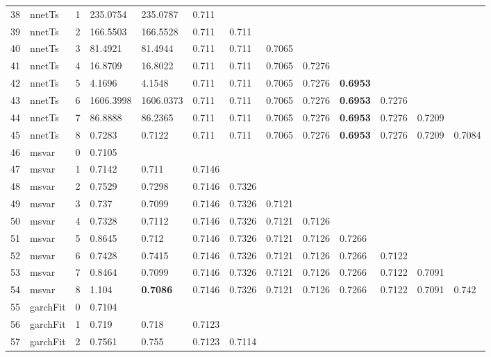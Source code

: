 \documentclass[10pt,a4paper]{article}
\begin{document}
\begin{table}[ht]
\begin{tabular}{rlrllllllllll}
  38 & nnetTs &     1 & 235.0754 & 235.0787 & 0.711 &  &  &  &  &  &  &  \\ 
  39 & nnetTs &     2 & 166.5503 & 166.5528 & 0.711 & 0.711 &  &  &  &  &  &  \\ 
  40 & nnetTs &     3 & 81.4921 & 81.4944 & 0.711 & 0.711 & 0.7065 &  &  &  &  &  \\ 
  41 & nnetTs &     4 & 16.8709 & 16.8022 & 0.711 & 0.711 & 0.7065 & 0.7276 &  &  &  &  \\ 
  42 & nnetTs &     5 & 4.1696 & 4.1548 & 0.711 & 0.711 & 0.7065 & 0.7276 & \textbf{0.6953} &  &  &  \\ 
  43 & nnetTs &     6 & 1606.3998 & 1606.0373 & 0.711 & 0.711 & 0.7065 & 0.7276 & \textbf{0.6953} & 0.7276 &  &  \\ 
  44 & nnetTs &     7 & 86.8888 & 86.2365 & 0.711 & 0.711 & 0.7065 & 0.7276 & \textbf{0.6953} & 0.7276 & 0.7209 &  \\ 
  45 & nnetTs &     8 & 0.7283 & 0.7122 & 0.711 & 0.711 & 0.7065 & 0.7276 & \textbf{0.6953} & 0.7276 & 0.7209 & 0.7084 \\ 
   \hline
46 & msvar &     0 & 0.7105 &  &  &  &  &  &  &  &  &  \\ 
  47 & msvar &     1 & 0.7142 & 0.711 & 0.7146 &  &  &  &  &  &  &  \\ 
  48 & msvar &     2 & 0.7529 & 0.7298 & 0.7146 & 0.7326 &  &  &  &  &  &  \\ 
  49 & msvar &     3 & 0.737 & 0.7099 & 0.7146 & 0.7326 & 0.7121 &  &  &  &  &  \\ 
  50 & msvar &     4 & 0.7328 & 0.7112 & 0.7146 & 0.7326 & 0.7121 & 0.7126 &  &  &  &  \\ 
  51 & msvar &     5 & 0.8645 & 0.712 & 0.7146 & 0.7326 & 0.7121 & 0.7126 & 0.7266 &  &  &  \\ 
  52 & msvar &     6 & 0.7428 & 0.7415 & 0.7146 & 0.7326 & 0.7121 & 0.7126 & 0.7266 & 0.7122 &  &  \\ 
  53 & msvar &     7 & 0.8464 & 0.7099 & 0.7146 & 0.7326 & 0.7121 & 0.7126 & 0.7266 & 0.7122 & 0.7091 &  \\ 
  54 & msvar &     8 & 1.104 & \textbf{0.7086} & 0.7146 & 0.7326 & 0.7121 & 0.7126 & 0.7266 & 0.7122 & 0.7091 & 0.742 \\ 
   \hline
55 & garchFit &     0 & 0.7104 &  &  &  &  &  &  &  &  &  \\ 
  56 & garchFit &     1 & 0.719 & 0.718 & 0.7123 &  &  &  &  &  &  &  \\ 
  57 & garchFit &     2 & 0.7561 & 0.755 & 0.7123 & 0.7114 &  &  &  &  &  &  \\ 

\end{tabular}
\end{table}
\end{document}
